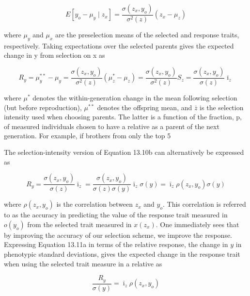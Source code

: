 \documentclass{article}
\begin{document}
\begin{equation}
E[y_{o}-\mu_{y}\mid z_{x}]=\frac{\sigma(z_{x},y_{o})}{\sigma^{2}(z)}\left(z_{x}-\mu_{z}\right)
\tag{13.10a}
\label{eq:13_10a}
\end{equation}

where  $ \mu_{y} $ and  $ \mu_{x} $ are the preselection means of the selected and response traits, respectively. Taking expectations over the selected parents gives the expected change in y from selection on x as

\begin{equation}
R_{y}=\mu_{y}^{**}-\mu_{y}=\frac{\sigma(z_{x},y_{o})}{\sigma^{2}(z)}(\mu_{z}^{*}-\mu_{z})=\frac{\sigma(z_{x},y_{o})}{\sigma^{2}(z)}S_{z}=\frac{\sigma(z_{x},y_{o})}{\sigma(z)}\bar{\imath}_{z}
\tag{13.10b}
\label{eq:13_10b}
\end{equation}

where  $ \mu^* $ denotes the within-generation change in the mean following selection (but before reproduction),  $ \mu^{**} $ denotes the offspring mean, and  $ \bar{z} $ is the selection intensity used when choosing parents. The latter is a function of the fraction, p, of measured individuals chosen to have a relative as a parent of the next generation. For example, if brothers from only the top 5%

The selection-intensity version of Equation 13.10b can alternatively be expressed as

\begin{equation}
R_{y}=\frac{\sigma(z_{x},y_{o})}{\sigma(z)}\bar{\imath}_{z}=\frac{\sigma(z_{x},y_{o})}{\sigma(z)\sigma(y)}\bar{\imath}_{z}\sigma(y)=\bar{\imath}_{z}\rho(z_{x},y_{o})\sigma(y)
\tag{13.11a}
\label{eq:13_11a}
\end{equation}

where  $ \rho(z_x, y_o) $ is the correlation between  $ z_x $ and  $ y_o $. This correlation is referred to as the accuracy in predicting the value of the response trait measured in  $ o(y_o) $ from the selected trait measured in  $ x(z_x) $. One immediately sees that by improving the accuracy of our selection scheme, we improve the response. Expressing Equation 13.11a in terms of the relative response, the change in  $ y $ in phenotypic standard deviations, gives the expected change in the response trait when using the selected trait measure in a relative as

\begin{equation}
\frac{R_{y}}{\sigma(y)}=\bar{\imath}_{z}\rho(z_{x},y_{o})
\tag{13.11b}
\label{eq:13_11b}
\end{equation}
\end{document}
